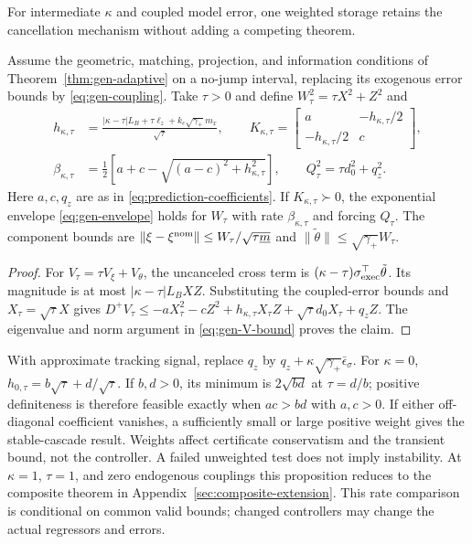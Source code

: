 For intermediate $\kappa$ and coupled model error, one weighted storage
retains the cancellation mechanism without adding a competing theorem.
\begin{proposition}
\label{prop:gen-weighted}
Assume the geometric, matching, projection, and information conditions
of Theorem~\ref{thm:gen-adaptive} on a no-jump interval, replacing its
exogenous error bounds by \eqref{eq:gen-coupling}. Take $\tau>0$ and define
$W_\tau^2=\tau X^2+Z^2$ and
\begin{align}
 h_{\kappa,\tau}&=
 \frac{|\kappa-\tau|L_B+\tau\ell_z+k_c\sqrt{\gamma_+}m_x}{\sqrt\tau},
 \qquad
 K_{\kappa,\tau}=\begin{bmatrix}a&-h_{\kappa,\tau}/2\\-h_{\kappa,\tau}/2&c\end{bmatrix},
 \label{eq:gen-weighted-matrix}\\
 \beta_{\kappa,\tau}&=\tfrac12\left[a+c-\sqrt{(a-c)^2+h_{\kappa,\tau}^2}\right],
 \qquad Q_\tau^2=\tau d_0^2+q_z^2.
 \label{eq:gen-matrix}
\end{align}
Here $a,c,q_z$ are as in \eqref{eq:prediction-coefficients}. If
$K_{\kappa,\tau}\succ0$, the exponential envelope
\eqref{eq:gen-envelope} holds for $W_\tau$ with rate
$\beta_{\kappa,\tau}$ and forcing $Q_\tau$.
The component bounds are
$\|\xi-\xi^{\rm nom}\|\le W_\tau/\sqrt{\tau\underline m}$ and
$\|\tilde\theta\|\le\sqrt{\gamma_+}W_\tau$.
\end{proposition}
\begin{proof}
For $V_\tau=\tau V_\xi+V_\theta$, the uncanceled cross term is
$(\kappa-\tau)\sigma_{\rm exec}^\top\tilde\theta$. Its magnitude is at most
$|\kappa-\tau|L_BXZ$. Substituting the coupled-error bounds and
$X_\tau=\sqrt\tau X$ gives
$D^+V_\tau\le-aX_\tau^2-cZ^2+h_{\kappa,\tau}X_\tau Z+
\sqrt\tau d_0X_\tau+q_zZ$.
The eigenvalue and norm argument in \eqref{eq:gen-V-bound} proves the claim.
\end{proof}
With approximate tracking signal, replace $q_z$ by
$q_z+\kappa\sqrt{\gamma_+}\bar\epsilon_\sigma$.
For $\kappa=0$, $h_{0,\tau}=b\sqrt\tau+d/\sqrt\tau$.
If $b,d>0$, its minimum is $2\sqrt{bd}$ at $\tau=d/b$; positive
definiteness is therefore feasible exactly when $ac>bd$ with $a,c>0$.
If either off-diagonal coefficient vanishes, a sufficiently small or
large positive weight gives the stable-cascade result. Weights affect
certificate conservatism and the transient bound, not the controller.
A failed unweighted test does not imply instability. At $\kappa=1$,
$\tau=1$, and zero endogenous couplings this proposition reduces to the
composite theorem in Appendix~\ref{sec:composite-extension}. This rate comparison is conditional on common valid
bounds; changed controllers may change the actual regressors and errors.

